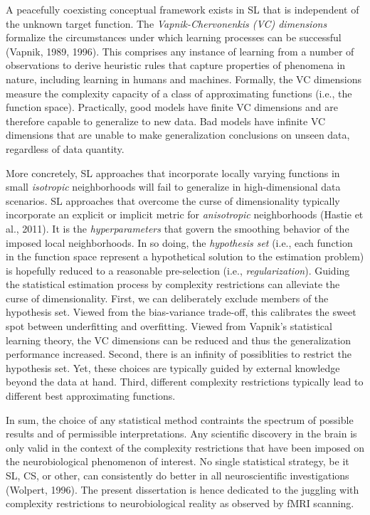 \documentclass[authoryear,review,3p]{elsarticle}
\begin{document}
A peacefully coexisting conceptual framework exists in SL
that is independent
of the unknown target function.
The \textit{Vapnik-Chervonenkis (VC) dimensions}
formalize the circumstances
under which learning processes can be successful (Vapnik, 1989, 1996).
This comprises any instance of learning
from a number of observations
to derive heuristic rules that capture properties of phenomena in nature,
including learning in humans and machines.
Formally, the VC dimensions measure the
complexity capacity of a class of approximating functions
(i.e., the function space). 
%
Practically, good models have finite VC dimensions
and are therefore capable to generalize to new data.
Bad models have infinite VC dimensions that
are unable to make generalization conclusions on unseen data,
regardless of data quantity.



More concretely,
SL approaches that incorporate locally varying functions
in small \textit{isotropic} neighborhoods
will fail to generalize in high-dimensional data scenarios.
SL approaches that overcome the curse of dimensionality typically
incorporate an explicit or implicit metric for
\textit{anisotropic} neighborhoods
(Hastie et al., 2011).
%
It is the \textit{hyperparameters} that govern the
smoothing behavior of the imposed local neighborhoods.
%
In so doing,
the \textit{hypothesis set} (i.e., each function in the function space
represent a hypothetical solution to
the estimation problem) is hopefully reduced to
a reasonable pre-selection (i.e., \textit{regularization}).
%
Guiding the statistical estimation process by
complexity restrictions can alleviate the curse of dimensionality.
First,
we can deliberately exclude members of the hypothesis set.
Viewed from the bias-variance trade-off, this calibrates
the sweet spot between underfitting and overfitting.
Viewed from Vapnik's statistical learning theory,
the VC dimensions can be reduced and thus the generalization performance
increased.
%
Second, there is an infinity of possiblities to restrict the hypothesis set.
Yet, these choices are typically guided by external knowledge beyond
the data at hand.
%
Third,
different complexity restrictions typically lead to different
best approximating functions.


In sum,
the choice of any statistical method contraints
the spectrum of possible results and of permissible interpretations.
Any scientific discovery in the brain is only valid in the
context of the complexity restrictions that have been imposed
on the neurobiological phenomenon of interest.
%
No single statistical strategy, be it SL, CS, or other,
can consistently
do better in all neuroscientific investigations
(Wolpert, 1996).
%
The present dissertation
is hence dedicated to the juggling with
complexity restrictions to
neurobiological reality as observed by fMRI scanning.
\end{document}
